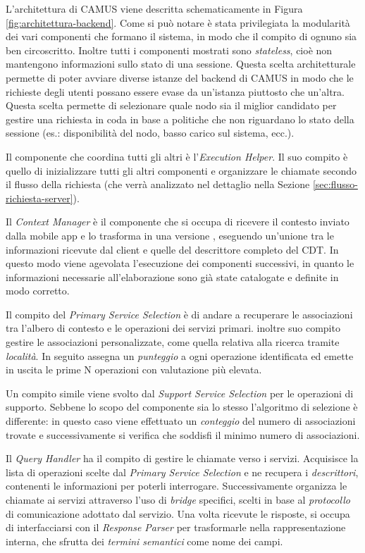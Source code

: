 L'architettura di CAMUS viene descritta schematicamente in Figura \ref{fig:architettura-backend}. Come si può notare è stata privilegiata la modularità dei vari componenti che formano il sistema, in modo che il compito di ognuno sia ben circoscritto. Inoltre tutti i componenti mostrati sono \emph{stateless}, cioè non mantengono informazioni sullo stato di una sessione. Questa scelta architetturale permette di poter avviare diverse istanze del backend di CAMUS in modo che le richieste degli utenti possano essere evase da un'istanza piuttosto che un'altra. Questa scelta permette di selezionare quale nodo sia il miglior candidato per gestire una richiesta in coda in base a politiche che non riguardano lo stato della sessione (es.: disponibilità del nodo, basso carico sul sistema, ecc.).

Il componente che coordina tutti gli altri è l'\emph{Execution Helper}. Il suo compito è quello di inizializzare tutti gli altri componenti e organizzare le chiamate secondo il flusso della richiesta (che verrà analizzato nel dettaglio nella Sezione \ref{sec:flusso-richiesta-server}).

Il \emph{Context Manager} è il componente che si occupa di ricevere il contesto inviato dalla mobile app e lo trasforma in una versione , eseguendo un'unione tra le informazioni ricevute dal client e quelle del descrittore completo del CDT. In questo modo viene agevolata l'esecuzione dei componenti successivi, in quanto le informazioni necessarie all'elaborazione sono già state catalogate e definite in modo corretto.

Il compito del \emph{Primary Service Selection} è di andare a recuperare le associazioni tra l'albero di contesto e le operazioni dei servizi primari. \upe inoltre suo compito gestire le associazioni personalizzate, come quella relativa alla ricerca tramite \emph{località}. In seguito assegna un \emph{punteggio} a ogni operazione identificata ed emette in uscita le prime N operazioni con valutazione più elevata.

Un compito simile viene svolto dal \emph{Support Service Selection} per le operazioni di supporto. Sebbene lo scopo del componente sia lo stesso l'algoritmo di selezione è differente: in questo caso viene effettuato un \emph{conteggio} del numero di associazioni trovate e successivamente si verifica che soddisfi il minimo numero di associazioni.

Il \emph{Query Handler} ha il compito di gestire le chiamate verso i servizi. Acquisisce la lista di operazioni scelte dal \emph{Primary Service Selection} e ne recupera i \emph{descrittori}, contenenti le informazioni per poterli interrogare. Successivamente organizza le chiamate ai servizi attraverso l'uso di \emph{bridge} specifici, scelti in base al \emph{protocollo} di comunicazione adottato dal servizio. Una volta ricevute le risposte, si occupa di interfacciarsi con il \emph{Response Parser} per trasformarle nella rappresentazione interna, che sfrutta dei \emph{termini semantici} come nome dei campi.

